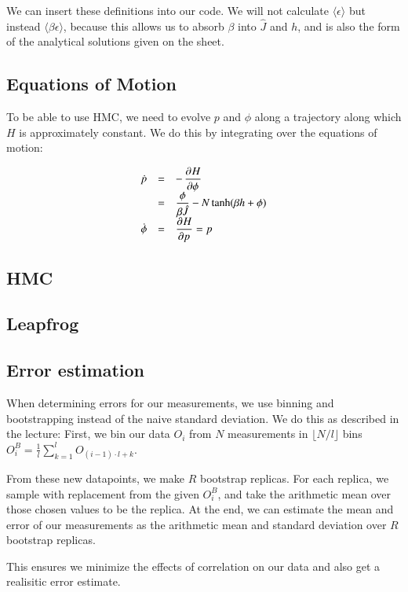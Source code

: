 \documentclass{scrartcl}
\begin{document}
We can insert these definitions into our code. We will not calculate $\langle \epsilon\rangle$ but instead $\langle \beta\epsilon\rangle$, because this allows us to absorb $\beta$ into $\hat{J}$ and $h$, and is also the form of the analytical solutions given on the sheet.



\subsection{Equations of Motion}

To be able to use HMC, we need to evolve $p$ and $\phi$ along a trajectory along which $H$ is approximately constant. We do this by integrating over the equations of motion:

\[\begin{array}{>{\displaystyle}r>{\displaystyle}c>{\displaystyle}l}
\dot{p}&=&-\dpd{H}{\phi}\\
&=&\frac{\phi}{\beta \hat{J}}-N\tanh(\beta h+\phi)\\
\dot{\phi}&=&\dpd{H}{p}=p
\end{array}\]

\subsection{HMC}

\subsection{Leapfrog}

\subsection{Error estimation}
When determining errors for our measurements, we use binning and bootstrapping instead of the naive standard deviation. 
We do this as described in the lecture: First, we bin our data $O_i$ from $N$ measurements in $\lfloor N/l\rfloor$ bins $O^B_i=\frac{1}{l}\sum_{k=1}^l O_{(i-1)\cdot l+k}$. 

From these new datapoints, we make $R$ bootstrap replicas. For each replica, we sample with replacement from the given $O_i^B$, and take the arithmetic mean over those chosen values to be the replica. At the end, we can estimate the mean and error of our measurements as the arithmetic mean and standard deviation over $R$ bootstrap replicas.

This ensures we minimize the effects of correlation on our data and also get a realisitic error estimate.
\end{document}
